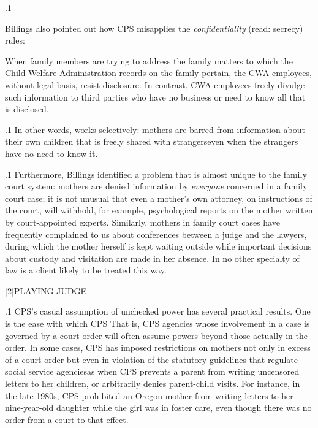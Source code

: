 \documentclass[11pt, twoside]{article}
\begin{document}
{\p.1{%
Billings also pointed out how CPS misapplies the \textit{confidentiality} (read:
secrecy) rules:

\begin{blockQuote}
When family members are trying to address the family matters to
which the Child Welfare Administration records on the family pertain, the CWA employees, without legal basis, resist disclosure. In
contrast, CWA employees freely divulge such information to third
parties who have no business or need to know all that is disclosed.
\end{blockQuote}

}%

\p.1{%
In other words,  works selectively: mothers are
barred from information about their own children that is freely shared
with strangers\mdash{}even when the strangers have no need to know it.
}%

\p.1{%
Furthermore, Billings identified a problem that is almost unique to
the family court system: mothers are denied information by \textit{everyone}
concerned in a family court case; it is not unusual that even a mother's
own attorney, on instructions of the court, will withhold, for example,
psychological reports on the mother written by court-appointed experts.
Similarly, mothers in family court cases have frequently complained to
us about conferences between a judge and the lawyers, during which the
mother herself is kept waiting outside while important decisions about
custody and visitation are made in her absence. In no other specialty of
law is a client likely to be treated this way.
}%


\s|2|{PLAYING JUDGE}

\p.1{%
\noindent{}CPS's casual assumption of unchecked power has several practical results. One is the ease with which CPS  That is, CPS agencies
whose involvement in a case is governed by a court order will often assume powers beyond those actually in the order. In some cases, CPS
has imposed restrictions on mothers not only in excess of a court order
but even in violation of the statutory guidelines that regulate social
service agencies\mdash{}as when CPS prevents a parent from writing uncensored letters to her children, or arbitrarily denies parent-child visits.  For
instance, in the late 1980s, CPS prohibited an Oregon mother from
writing letters to her nine-year-old daughter while the girl was in foster
care, even though there was no order from a court to that effect.
}%

}
\end{document}
